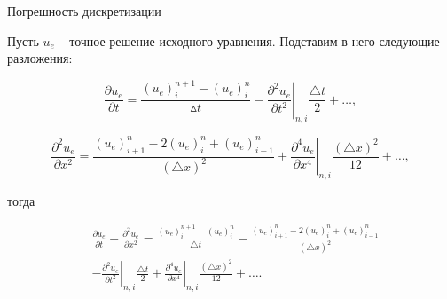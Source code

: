 \documentclass[10pt,xcolor=pst,aspectratio=169]{beamer}
\begin{document}
\begin{frame}{Погрешность дискретизации}

	\transdissolve[duration=0.1]
	\justifying
	\large

    Пусть $u_{e}$ -- точное решение исходного уравнения. Подставим в него следующие разложения:

    \[
        \frac{\partial u_{e}}{\partial t} = \frac{\left( u_{e} \right)^{n + 1}_{i} - \left( u_{e} \right)^{n}_{i}}{\vartriangle t} - \left. \frac{\partial^{2} u_{e}}{\partial t^{2}} \right|_{n, i} \frac{\triangle t}{2} + \ldots ,
    \]

    \[
        \frac{\partial^{2} u_{e}}{\partial x^{2}} = \frac{\left( u_{e} \right)^{n}_{i + 1} - 2 \left( u_{e} \right)^{n}_{i} + \left( u_{e} \right)^{n}_{i - 1}}{\left( \triangle x \right)^{2}} + \left. \frac{\partial^{4} u_{e}}{\partial x^{4}} \right|_{n, i} \frac{\left( \triangle x \right)^{2}}{12} + \ldots ,
    \]

    тогда

    \[
        \begin{split}
            &\frac{\partial u_{e}}{\partial t} - \frac{\partial^{2} u_{e}}{\partial x^{2}} = \frac{\left( u_{e} \right)^{n + 1}_{i} - \left( u_{e} \right)^{n}_{i}}{\triangle t} - \frac{\left( u_{e} \right)^{n}_{i + 1} - 2 \left( u_{e} \right)^{n}_{i} + \left( u_{e} \right)^{n}_{i - 1}}{\left(\triangle x\right)^{2}} \\
            &- \left. \frac{\partial^{2} u_{e}}{\partial t^{2}} \right|_{n, i} \frac{\triangle t}{2} + \left. \frac{\partial^{4} u_{e}}{\partial x^{4}} \right|_{n, i} \frac{\left( \triangle x \right)^{2}}{12} + \ldots.
        \end{split}
    \]

\end{frame}

%
%
%
%
%
% 
\end{document}
